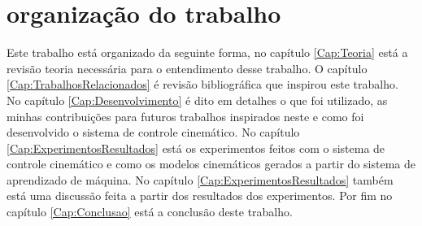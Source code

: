 \section{organização do trabalho}

Este trabalho está organizado da seguinte forma, no capítulo \ref{Cap:Teoria}
está a revisão teoria necessária para o entendimento desse trabalho. O capítulo
\ref{Cap:TrabalhosRelacionados} é revisão bibliográfica que inspirou este
trabalho. No capítulo \ref{Cap:Desenvolvimento} é dito em detalhes o que foi
utilizado, as minhas contribuições para futuros trabalhos inspirados neste e
como foi desenvolvido o sistema de controle cinemático. No capítulo
\ref{Cap:ExperimentosResultados}
está os experimentos feitos com o sistema de controle cinemático
e como os modelos cinemáticos gerados a partir do sistema de aprendizado de
máquina.
No capítulo \ref{Cap:ExperimentosResultados} também está uma discussão feita
a partir dos resultados dos experimentos. Por fim  no capítulo \ref{Cap:Conclusao} está a conclusão deste
trabalho.
